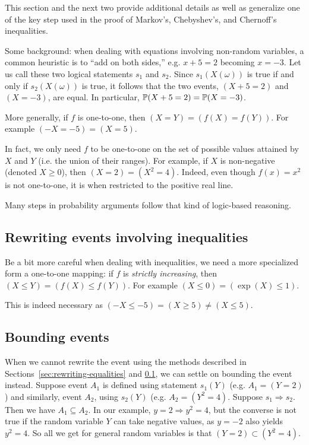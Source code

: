 \documentclass{article}
\begin{document}
This section and the next two provide additional details as well as generalize one of the key step used in the proof of Markov's, Chebyshev's, and Chernoff's inequalities.

Some background: when dealing with equations involving non-random variables, a common heuristic is to ``add on both sides,'' e.g. $x + 5 = 2$ becoming $x = -3$. Let us call these two logical statements $s_1$ and $s_2$. Since $s_1(X(\omega))$ is true if and only if  $s_2(X(\omega))$ is true, it follows that the two events, $(X + 5 = 2)$ and $(X = -3)$, are equal. In particular, $\P(X + 5 = 2) = \P(X = -3)$.

More generally, if $f$ is one-to-one, then $(X = Y) = (f(X) = f(Y))$. For example $(-X = -5) = (X = 5)$. 

In fact, we only need $f$ to be one-to-one on the set of possible values attained by $X$ and $Y$ (i.e. the union of their ranges). For example, if $X$ is non-negative (denoted $X \ge 0$), then $(X = 2) = (X^2 = 4)$. Indeed, even though $f(x) = x^2$ is not one-to-one, it is when restricted to the positive real line.

Many steps in probability arguments follow that kind of logic-based reasoning.


\subsection{Rewriting events involving inequalities}\label{sec:rewriting-inequalities}

Be a bit more careful when dealing with inequalities, we need a more specialized form a one-to-one mapping: if $f$ is \emph{strictly increasing}, then $(X \le Y) = (f(X) \le f(Y))$. For example $(X \le 0) = (\exp(X) \le 1)$.

This is indeed necessary as $(-X \le -5) = (X \ge 5) \neq (X \le 5)$.


\subsection{Bounding events}

When we cannot rewrite the event using the methods described in Sections~\ref{sec:rewriting-equalities} and \ref{sec:rewriting-inequalities}, we can settle on bounding the event instead. Suppose event $A_1$ is defined using statement $s_1(Y)$ (e.g. $A_1 = (Y = 2)$) and similarly, event $A_2$, using $s_2(Y)$ (e.g. $A_2 = (Y^2 = 4)$. Suppose $s_1 \Longrightarrow s_2$. Then we have $A_1 \subseteq A_2$. In our example, $y = 2 \Longrightarrow y^2 = 4$, but the converse is not true if the random variable $Y$ can take negative values, as $y = -2$ also yields $y^2 = 4$. So all we get for general random variables is that $(Y = 2) \subset (Y^2 = 4)$.
\end{document}
